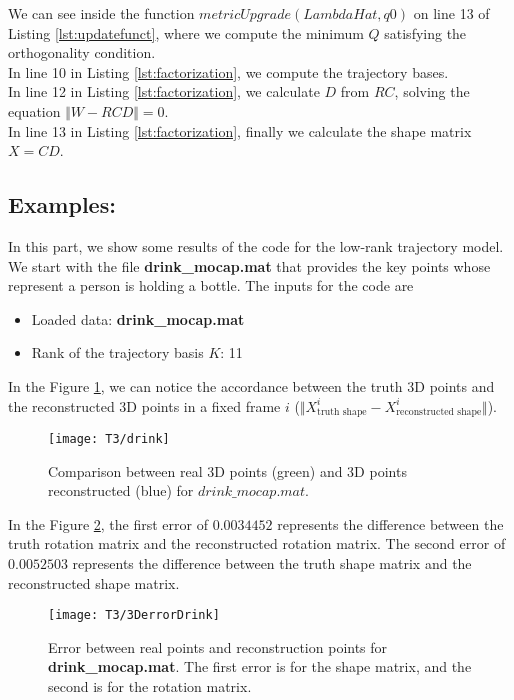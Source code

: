 \noindent We can see inside the function $metricUpgrade(LambdaHat,q0)$ on line 13 of Listing \ref{lst:updatefunct}, where we compute the minimum $Q$ satisfying the orthogonality condition.\\ 
\noindent In line 10 in Listing \ref{lst:factorization}, we compute the trajectory bases.\\
\noindent In line 12 in Listing \ref{lst:factorization}, we calculate $D$ from $RC$, solving the equation $\Vert W-RCD\Vert =0$.\\
\noindent In line 13 in Listing \ref{lst:factorization}, finally we calculate the shape matrix $X=CD$.\\
\subsection{Examples:}
\noindent In this part, we show some results of the code for the low-rank trajectory model.\\ 

\noindent We start with the file \textbf{drink\_mocap.mat} that provides the key points whose represent a person is holding a bottle. The inputs for the code are
\begin{itemize}
\item Loaded data: \textbf{drink\_mocap.mat} 
\item Rank of the trajectory basis $K$: 11 
\end{itemize}

\noindent In the Figure \ref{fig:drink}, we can notice the accordance between the truth 3D points and the reconstructed 3D points in a fixed frame $i$ ($\Vert X_{\text{truth shape}}^{i}-X_{\text{reconstructed shape}}^{i}\Vert$).\\
\begin{figure}[h]  
	\centering
	\texttt{[image: T3/drink]}
	\caption{Comparison between real 3D points (green) and 3D points reconstructed (blue) for \textbf{$drink\_mocap.mat$}.}
	\label{fig:drink}
\end{figure}

\noindent In the Figure \ref{fig:drink_error}, the first error of $0.0034452$ represents the difference between the truth rotation matrix and the reconstructed rotation matrix. The second error of $0.0052503$ represents the difference between the truth shape matrix and the reconstructed shape matrix. 
\begin{figure}[h]
	\centering
	\texttt{[image: T3/3DerrorDrink]}
	\caption{Error between real points and reconstruction points for \textbf{drink\_mocap.mat}. The first error is for the shape matrix, and the second is for the rotation matrix.}
	\label{fig:drink_error}
\end{figure}
\noindent 